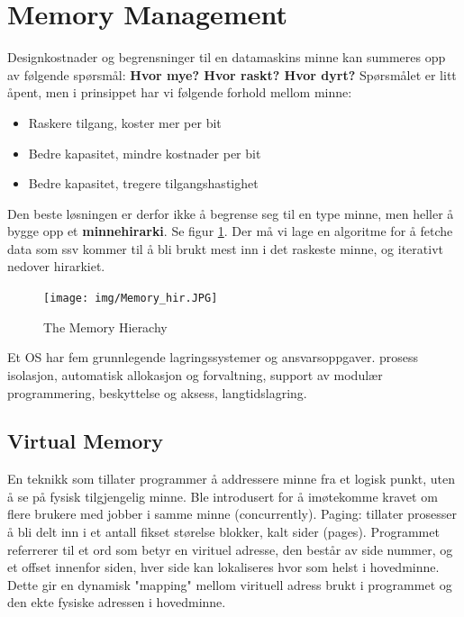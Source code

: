 \section{Memory Management}
Designkostnader og begrensninger til en datamaskins minne kan summeres opp av følgende spørsmål: \textbf{Hvor mye? Hvor raskt? Hvor dyrt?}
Spørsmålet er litt åpent, men i prinsippet har vi følgende forhold mellom minne:
\begin{itemize}
\item Raskere tilgang, koster mer per bit
\item Bedre kapasitet, mindre kostnader per bit
\item Bedre kapasitet, tregere tilgangshastighet
\end{itemize}
Den beste løsningen er derfor ikke å begrense seg til en type minne, men heller å bygge opp et \textbf{minnehirarki}. Se figur \ref{fig:the_mem_hir}. Der må vi lage en algoritme for å fetche data som ssv kommer til å bli brukt mest inn i det raskeste minne, og iterativt nedover hirarkiet.

\begin{figure}
\centering
\texttt{[image: img/Memory\_hir.JPG]}
\caption{The Memory Hierachy}
\label{fig:the_mem_hir}
\end{figure}
Et OS har fem grunnlegende lagringssystemer og ansvarsoppgaver.
prosess isolasjon, automatisk allokasjon og forvaltning, support av modulær programmering, beskyttelse og aksess, langtidslagring.
\subsection{Virtual Memory}
En teknikk som tillater programmer å addressere minne fra et logisk punkt, uten å se på fysisk tilgjengelig minne. Ble introdusert for å imøtekomme kravet om flere brukere med jobber i samme minne (concurrently).
Paging: tillater prosesser å bli delt inn i et antall fikset størelse blokker, kalt sider (pages).
Programmet referrerer til et ord som betyr en virituel adresse, den består av side nummer, og et offset innenfor siden, hver side kan lokaliseres hvor som helst i hovedminne. Dette gir en dynamisk "mapping" mellom virituell adress brukt i programmet og den ekte fysiske adressen i hovedminne.

